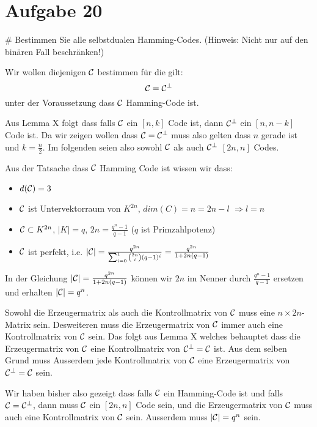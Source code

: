 \section*{Aufgabe 20}
\begin{myList}
#
Bestimmen Sie alle selbstdualen Hamming-Codes.
(Hinweis: Nicht nur auf den binären Fall beschränken!)\medskip

Wir wollen diejenigen $\mathcal{C}$ bestimmen für die gilt:
\begin{equation*}
	\mathcal{C} = \mathcal{C}^\bot
\end{equation*}
unter der Voraussetzung dass $\mathcal{C}$ Hamming-Code ist.\medskip

Aus Lemma X folgt dass falls $\mathcal{C}$ ein $[n,k]$ Code ist, dann $\mathcal{C}^\bot$ ein $[n,n-k]$ Code ist. Da wir zeigen wollen dass $\mathcal{C} = \mathcal{C}^\bot$ muss also gelten dass $n$ gerade ist und $k = \frac{n}{2}$.
Im folgenden seien also sowohl $\mathcal{C}$ als auch $\mathcal{C}^\bot$ $[2n, n]$ Codes.\medskip

Aus der Tatsache dass $\mathcal{C}$ Hamming Code ist wissen wir dass:
\begin{itemize}
	\item $d(\mathcal{C}) = 3$
	\item $\mathcal{C}$ ist Untervektorraum von $K^{2n}$, $dim(C) = n = 2n - l$ $\Rightarrow l = n$
	\item $\mathcal{C} \subset K^{2n}$, $|K| = q$, $2n = \frac{q^n - 1}{q -1}$ ($q$ ist Primzahlpotenz)
	\item $\mathcal{C}$ ist perfekt, i.e. $|\mathcal{C}| = \frac{q^{2n}}{\sum_{i=0}^1 \binom{2n}{i}(q -1)^i} =  \frac{q^{2n}}{ 1 + 2n(q -1)}$
\end{itemize}\medskip

In der Gleichung $|\mathcal{C}| = \frac{q^{2n}}{1 + 2n(q-1)}$ können wir $2n$ im Nenner durch $\frac{q^n -1}{q-1}$ ersetzen und erhalten $|\mathcal{C}| = q^n$.\medskip

Sowohl die Erzeugermatrix als auch die Kontrollmatrix von $\mathcal{C}$ muss eine $n \times 2n$-Matrix sein.
Desweiteren muss die Erzeugermatrix von $\mathcal{C}$ immer auch eine Kontrollmatrix von $\mathcal{C}$ sein.
Das folgt aus Lemma X welches behauptet dass die Erzeugermatrix von $\mathcal{C}$ eine Kontrollmatrix von $\mathcal{C}^\bot = \mathcal{C}$ ist. 
Aus dem selben Grund muss Ausserdem jede Kontrollmatrix von $\mathcal{C}$ eine Erzeugermatrix von $\mathcal{C}^\bot = \mathcal{C}$ sein.\medskip

Wir haben bisher also gezeigt dass falls $\mathcal{C}$ ein Hamming-Code ist und falls $\mathcal{C} = \mathcal{C}^\bot$, dann muss $\mathcal{C}$ ein $[2n,n]$ Code sein, und die Erzeugermatrix von $\mathcal{C}$ muss auch eine Kontrollmatrix von $\mathcal{C}$ sein. Ausserdem muss $|\mathcal{C}| = q^n$ sein.\medskip


\end{myList}
